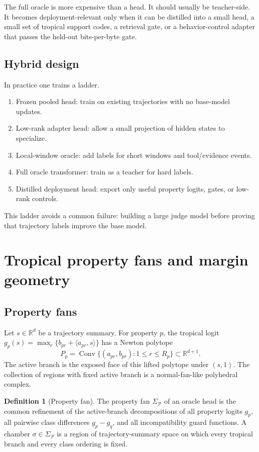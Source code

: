 \documentclass[11pt]{article}
\theoremstyle{definition}
\newtheorem{definition}[theorem]{Definition}
\theoremstyle{remark}
\newcommand{\R}{\mathbb{R}}
\newcommand{\Conv}{\operatorname{Conv}}
\newcommand{\Prop}{\mathcal{P}}
\numberwithin{equation}{section}
\begin{document}
The full oracle is more expensive than a head.  It should usually be teacher-side.  It becomes deployment-relevant only when it can be distilled into a small head, a small set of tropical support codes, a retrieval gate, or a behavior-control adapter that passes the held-out bits-per-byte gate.

\subsection{Hybrid design}

In practice one trains a ladder.
\begin{enumerate}
    \item Frozen pooled head: train on existing trajectories with no base-model updates.
    \item Low-rank adapter head: allow a small projection of hidden states to specialize.
    \item Local-window oracle: add labels for short windows and tool/evidence events.
    \item Full oracle transformer: train as a teacher for hard labels.
    \item Distilled deployment head: export only useful property logits, gates, or low-rank controls.
\end{enumerate}

This ladder avoids a common failure: building a large judge model before proving that trajectory labels improve the base model.

\section{Tropical property fans and margin geometry}

\subsection{Property fans}

Let \(s\in\R^d\) be a trajectory summary.  For property \(p\), the tropical logit \(g_p(s)=\max_r\{b_{pr}+\langle a_{pr},s\rangle\}\) has a Newton polytope
\begin{equation}
    P_p=\Conv\{(a_{pr},b_{pr}):1\le r\le R_p\}\subset \R^{d+1}.
\end{equation}
The active branch is the exposed face of this lifted polytope under \((s,1)\).  The collection of regions with fixed active branch is a normal-fan-like polyhedral complex.

\begin{definition}[Property fan]
The property fan \(\Sigma_{\Prop}\) of an oracle head is the common refinement of the active-branch decompositions of all property logits \(g_p\), all pairwise class differences \(g_p-g_q\), and all incompatibility guard functions.  A chamber \(\sigma\in\Sigma_{\Prop}\) is a region of trajectory-summary space on which every tropical branch and every class ordering is fixed.
\end{definition}
\end{document}
